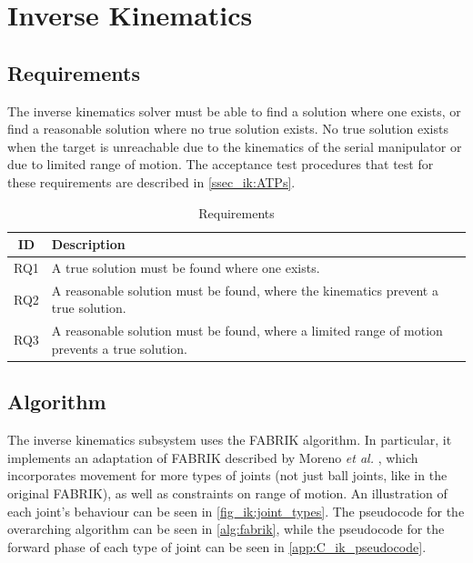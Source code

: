 \chapter{Inverse Kinematics}\label{ch:ik}

\section{Requirements}
The inverse kinematics solver must be able to find a solution where one exists, or find a reasonable solution where no true solution exists. No true solution exists when the target is unreachable due to the kinematics of the serial manipulator or due to limited range of motion. The acceptance test procedures that test for these requirements are described in \autoref{ssec_ik:ATPs}.

\begin{table}[h!]
\centering
\caption{Requirements}
\label{tab_ik:requirements}
\small{
\begin{tabular}{|c|p{}|}
    \hline
    \textbf{ID} & \textbf{Description} \\
    \hline \hline
    RQ1 & A true solution must be found where one exists. \\
    \hline
    RQ2 & A reasonable solution must be found, where the kinematics prevent a true solution. \\
    \hline
    RQ3 & A reasonable solution must be found, where a limited range of motion prevents a true solution. \\
    \hline
\end{tabular}
}
\end{table}

\section{Algorithm}
The inverse kinematics subsystem uses the FABRIK algorithm. In particular, it implements an adaptation of FABRIK described by Moreno \textit{et al.} \cite{bib:ik_FABRIK_constraints}, which incorporates movement for more types of joints (not just ball joints, like in the original FABRIK), as well as constraints on range of motion. An illustration of each joint's behaviour can be seen in \autoref{fig_ik:joint_types}. The pseudocode for the overarching algorithm can be seen in \autoref{alg:fabrik}, while the pseudocode for the forward phase of each type of joint can be seen in \autoref{app:C_ik_pseudocode}.

